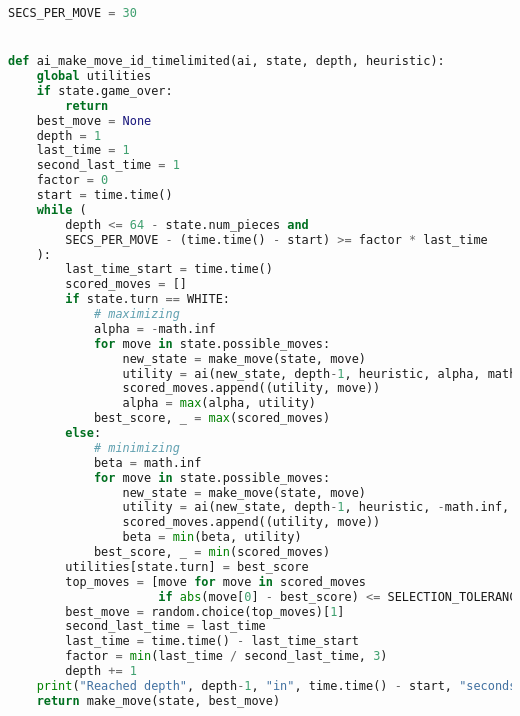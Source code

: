 \begin{lstlisting}[language=Python]
SECS_PER_MOVE = 30


def ai_make_move_id_timelimited(ai, state, depth, heuristic):
    global utilities
    if state.game_over:
        return
    best_move = None
    depth = 1
    last_time = 1
    second_last_time = 1
    factor = 0
    start = time.time()
    while (
        depth <= 64 - state.num_pieces and
        SECS_PER_MOVE - (time.time() - start) >= factor * last_time
    ):
        last_time_start = time.time()
        scored_moves = []
        if state.turn == WHITE:
            # maximizing
            alpha = -math.inf
            for move in state.possible_moves:
                new_state = make_move(state, move)
                utility = ai(new_state, depth-1, heuristic, alpha, math.inf)
                scored_moves.append((utility, move))
                alpha = max(alpha, utility)
            best_score, _ = max(scored_moves)
        else:
            # minimizing
            beta = math.inf
            for move in state.possible_moves:
                new_state = make_move(state, move)
                utility = ai(new_state, depth-1, heuristic, -math.inf, beta)
                scored_moves.append((utility, move))
                beta = min(beta, utility)
            best_score, _ = min(scored_moves)
        utilities[state.turn] = best_score
        top_moves = [move for move in scored_moves
                     if abs(move[0] - best_score) <= SELECTION_TOLERANCE]
        best_move = random.choice(top_moves)[1]
        second_last_time = last_time
        last_time = time.time() - last_time_start
        factor = min(last_time / second_last_time, 3)
        depth += 1
    print("Reached depth", depth-1, "in", time.time() - start, "seconds")
    return make_move(state, best_move)
\end{lstlisting}

